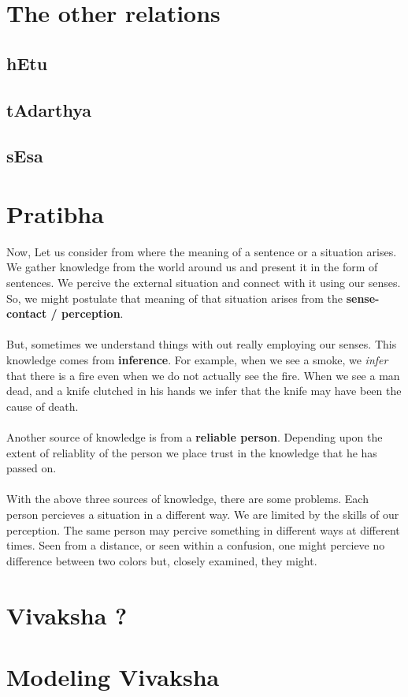\documentclass[a4paper,10pt]{article}
\begin{document}
\section{The other relations}
  \subsection{hEtu}
  \subsection{tAdarthya}
  \subsection{sEsa}
\section{Pratibha}
Now, Let us consider from where the meaning of a sentence or a situation arises. 
We gather knowledge from the world around us and present it in the form of sentences.
We percive the external situation and connect with it using our senses. 
So, we might postulate that meaning of that situation arises from the \textbf{sense-contact / perception}.

\paragraph{} But, sometimes we understand things with out really employing our senses. 
This knowledge comes from \textbf{inference}.
For example, when we see a smoke, we \textit{infer} that there is a fire even when we do not actually see the fire. 
When we see a man dead, and a knife clutched in his hands we infer that the knife may have been the cause of death.

\paragraph{} Another source of knowledge is from a \textbf{reliable person}. 
Depending upon the extent of reliablity of the person we place trust in the knowledge that he has passed on.

\paragraph{} With the above three sources of knowledge, there are some problems. Each person percieves a situation in a different way. 
We are limited by the skills of our perception. The same person may percive something in different ways at different times. 
Seen from a distance, or seen within a confusion, one might percieve no difference between two colors but, closely examined, they might.


\newpage
\section{Vivaksha ?}
\newpage
\section{Modeling Vivaksha}
\end{document}
